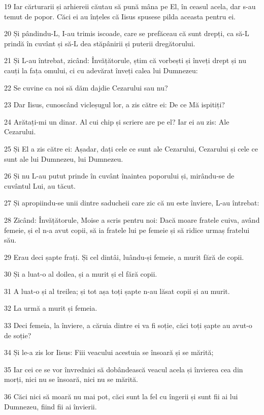 \par 19 Iar cărturarii și arhiereii căutau să pună mâna pe El, în ceasul acela, dar s-au temut de popor. Căci ei au înțeles că Iisus spusese pilda aceasta pentru ei.
\par 20 Și pândindu-L, I-au trimis iscoade, care se prefăceau că sunt drepți, ca să-L prindă în cuvânt și să-L dea stăpânirii și puterii dregătorului.
\par 21 Și L-au întrebat, zicând: Învățătorule, știm că vorbești și înveți drept și nu cauți la fața omului, ci cu adevărat înveți calea lui Dumnezeu:
\par 22 Se cuvine ca noi să dăm dajdie Cezarului sau nu?
\par 23 Dar Iisus, cunoscând vicleșugul lor, a zis către ei: De ce Mă ispitiți?
\par 24 Arătați-mi un dinar. Al cui chip și scriere are pe el? Iar ei au zis: Ale Cezarului.
\par 25 Și El a zis către ei: Așadar, dați cele ce sunt ale Cezarului, Cezarului și cele ce sunt ale lui Dumnezeu, lui Dumnezeu.
\par 26 Și nu L-au putut prinde în cuvânt înaintea poporului și, mirându-se de cuvântul Lui, au tăcut.
\par 27 Și apropiindu-se unii dintre saducheii care zic că nu este înviere, L-au întrebat:
\par 28 Zicând: Învățătorule, Moise a scris pentru noi: Dacă moare fratele cuiva, având femeie, și el n-a avut copii, să ia fratele lui pe femeie și să ridice urmaș fratelui său.
\par 29 Erau deci șapte frați. Și cel dintâi, luându-și femeie, a murit fără de copii.
\par 30 Și a luat-o al doilea, și a murit și el fără copii.
\par 31 A luat-o și al treilea; și tot așa toți șapte n-au lăsat copii și au murit.
\par 32 La urmă a murit și femeia.
\par 33 Deci femeia, la înviere, a căruia dintre ei va fi soție, căci toți șapte au avut-o de soție?
\par 34 Și le-a zis lor Iisus: Fiii veacului acestuia se însoară și se mărită;
\par 35 Iar cei ce se vor învrednici să dobândească veacul acela și învierea cea din morți, nici nu se însoară, nici nu se mărită.
\par 36 Căci nici să moară nu mai pot, căci sunt la fel cu îngerii și sunt fii ai lui Dumnezeu, fiind fii ai învierii.
